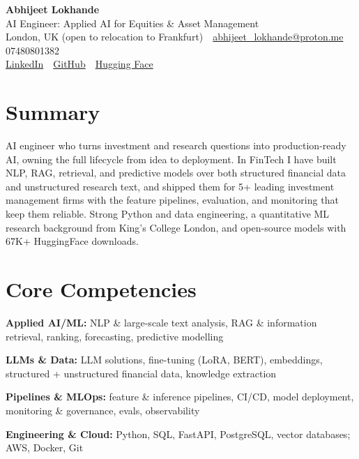 \documentclass[10pt,a4paper]{article}
\newcommand{\sep}{\,\textcolor{accent!60}{\textbar}\,}
\begin{document}
\begin{center}
  {\fontsize{24}{26}\selectfont\bfseries Abhijeet Lokhande}\\[3pt]
  {\color{accent}\large AI Engineer: Applied AI for Equities \& Asset Management}\\[5pt]
  {\small
    London, UK (open to relocation to Frankfurt) \sep
    \href{mailto:abhijeet_lokhande@proton.me}{abhijeet\_lokhande@proton.me} \sep
    07480801382 \\[2pt]
    \href{https://www.linkedin.com/in/ablds/}{LinkedIn} \sep
    \href{https://github.com/abhijeetscode}{GitHub} \sep
    \href{https://huggingface.co/ab-ai}{Hugging Face}
  }
\end{center}
\vspace{2pt}

\section{Summary}
AI engineer who turns investment and research questions into production-ready AI, owning the full lifecycle from idea to deployment. In FinTech I have built NLP, RAG, retrieval, and predictive models over both structured financial data and unstructured research text, and shipped them for 5+ leading investment management firms with the feature pipelines, evaluation, and monitoring that keep them reliable. Strong Python and data engineering, a quantitative ML research background from King's College London, and open-source models with 67K+ HuggingFace downloads.

\section{Core Competencies}
\begin{tight}
  \item[\textcolor{accent}{\small$\bullet$}] \textbf{Applied AI/ML:} NLP \& large-scale text analysis, RAG \& information retrieval, ranking, forecasting, predictive modelling
  \item[\textcolor{accent}{\small$\bullet$}] \textbf{LLMs \& Data:} LLM solutions, fine-tuning (LoRA, BERT), embeddings, structured + unstructured financial data, knowledge extraction
  \item[\textcolor{accent}{\small$\bullet$}] \textbf{Pipelines \& MLOps:} feature \& inference pipelines, CI/CD, model deployment, monitoring \& governance, evals, observability
  \item[\textcolor{accent}{\small$\bullet$}] \textbf{Engineering \& Cloud:} Python, SQL, FastAPI, PostgreSQL, vector databases; AWS, Docker, Git
\end{tight}
\end{document}
